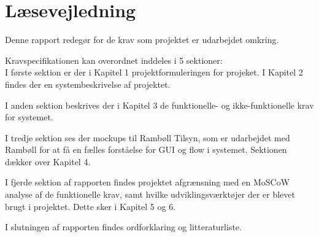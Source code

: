 \chapter*{Læsevejledning}
Denne rapport redegør for de krav som projektet er udarbejdet omkring. 

Kravspecifikationen kan overordnet inddeles i 5 sektioner:\\
I første sektion er der i Kapitel 1 projektformuleringen for projeket. I Kapitel 2 findes der en systembeskrivelse af projektet.

I anden sektion beskrives der i Kapitel 3 de funktionelle- og ikke-funktionelle krav for systemet.

I tredje sektion ses der mockups til Rambøll Tilsyn, som er udarbejdet med Rambøll for at få en fælles forståelse for GUI og flow i systemet. 
Sektionen dækker over Kapitel 4.

I fjerde sektion af rapporten findes projektet afgrænsning med en MoSCoW analyse af de funktionelle krav, samt hvilke udviklingsværktøjer der er blevet brugt i projektet. Dette sker i Kapitel 5 og 6.

I slutningen af rapporten  findes ordforklaring og litteraturliste.


